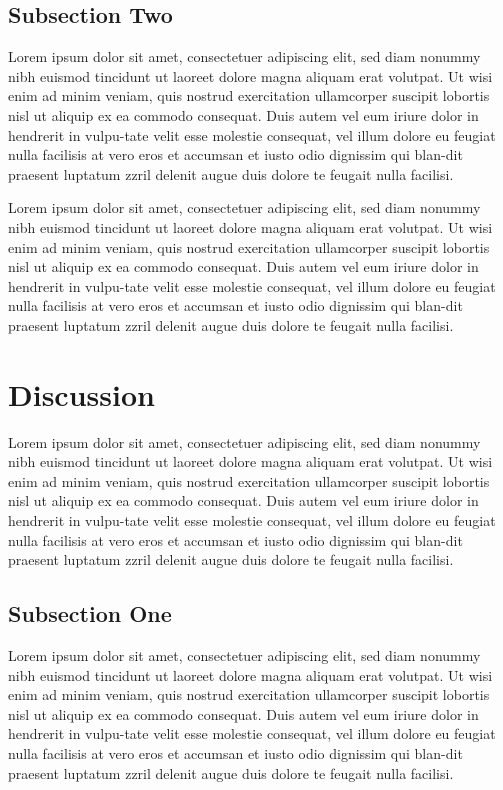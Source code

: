 \documentclass{vgtc}                          %
\begin{document}
\subsection{Subsection Two} \label{sec:invertedsphere}

Lorem ipsum dolor sit amet, consectetuer adipiscing elit, sed diam nonummy nibh euismod tincidunt ut laoreet dolore magna aliquam erat volutpat. Ut wisi enim ad minim veniam, quis nostrud exercit­ation ullamcorper suscipit lobortis nisl ut aliquip ex ea commodo consequat. Duis autem vel eum iriure dolor in hendrerit in vulpu-tate velit esse molestie consequat, vel illum dolore eu feugiat nulla facilisis at vero eros et accumsan et iusto odio dignissim qui blan-dit praesent luptatum zzril delenit augue duis dolore te feugait nulla facilisi.

Lorem ipsum dolor sit amet, consectetuer adipiscing elit, sed diam nonummy nibh euismod tincidunt ut laoreet dolore magna aliquam erat volutpat. Ut wisi enim ad minim veniam, quis nostrud exercit­ation ullamcorper suscipit lobortis nisl ut aliquip ex ea commodo consequat. Duis autem vel eum iriure dolor in hendrerit in vulpu-tate velit esse molestie consequat, vel illum dolore eu feugiat nulla facilisis at vero eros et accumsan et iusto odio dignissim qui blan-dit praesent luptatum zzril delenit augue duis dolore te feugait nulla facilisi.

\section{Discussion} \label{sec:agent}

Lorem ipsum dolor sit amet, consectetuer adipiscing elit, sed diam nonummy nibh euismod tincidunt ut laoreet dolore magna aliquam erat volutpat. Ut wisi enim ad minim veniam, quis nostrud exercit­ation ullamcorper suscipit lobortis nisl ut aliquip ex ea commodo consequat. Duis autem vel eum iriure dolor in hendrerit in vulpu-tate velit esse molestie consequat, vel illum dolore eu feugiat nulla facilisis at vero eros et accumsan et iusto odio dignissim qui blan-dit praesent luptatum zzril delenit augue duis dolore te feugait nulla facilisi.

\subsection{Subsection One} \label{sec:gearvrcontroller}

Lorem ipsum dolor sit amet, consectetuer adipiscing elit, sed diam nonummy nibh euismod tincidunt ut laoreet dolore magna aliquam erat volutpat. Ut wisi enim ad minim veniam, quis nostrud exercit­ation ullamcorper suscipit lobortis nisl ut aliquip ex ea commodo consequat. Duis autem vel eum iriure dolor in hendrerit in vulpu-tate velit esse molestie consequat, vel illum dolore eu feugiat nulla facilisis at vero eros et accumsan et iusto odio dignissim qui blan-dit praesent luptatum zzril delenit augue duis dolore te feugait nulla facilisi.
\end{document}
